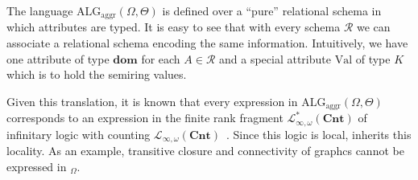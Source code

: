 The language $\text{ALG}_{\text{aggr}}(\Omega,\Theta)$ is defined over a ``pure'' relational schema in which attributes are typed. It is easy to see that with every \ARA schema $\mathcal{R}$ we can associate a relational schema encoding the same information. Intuitively, we have one attribute of type $\mathbf{dom}$ for each $A\in\mathcal{R}$ and a special attribute $\text{Val}$ of type $K$ which is to hold the semiring values.

Given this translation, it is known that every expression in  $\text{ALG}_{\text{aggr}}(\Omega,\Theta)$ corresponds to an expression in the finite rank fragment $\mathcal{L}_{\infty,\omega}^*(\textbf{Cnt})$ of infinitary logic with counting $\mathcal{L}_{\infty,\omega}(\textbf{Cnt})$~\cite{LIBKIN2003,Hella:2001}. 
Since this logic is local, \ARA inherits this locality. As an example, 
transitive closure and connectivity of graphcs cannot be expressed in \ARA$_{\Omega}$.
